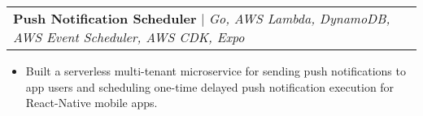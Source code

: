 \documentclass[letterpaper,11pt]{article}
\makeatletter
\newcommand{\resumeItem}[1]{
  \item\small{
    {#1 \vspace{-2pt}}
  }
}
\newcommand{\resumeProjectHeading}[2]{
    \item
    \begin{tabular*}{0.97\textwidth}{l@{\extracolsep{\fill}}r}
      \small#1 & #2 \\
    \end{tabular*}\vspace{-7pt}
}
\newcommand{\resumeItemListStart}{\begin{itemize}}
\newcommand{\resumeItemListEnd}{\end{itemize}\vspace{-5pt}}
\makeatother
\begin{document}
    
    





        \resumeProjectHeading
          {\textbf{Push Notification Scheduler} $|$ \emph{Go, AWS Lambda, DynamoDB, AWS Event Scheduler, AWS CDK, Expo}}{}
          \resumeItemListStart
          \resumeItem{Built a serverless multi-tenant microservice for sending push notifications to app users and scheduling one-time delayed push notification execution for React-Native mobile apps.}
          \resumeItemListEnd

\end{document}
